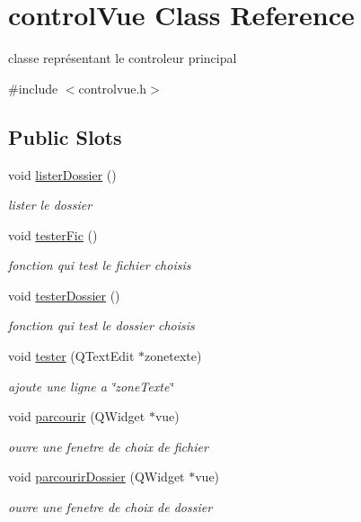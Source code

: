 \hypertarget{classcontrol_vue}{\section{control\-Vue Class Reference}
\label{classcontrol_vue}
}


classe représentant le controleur principal  




{\ttfamily \#include $<$controlvue.\-h$>$}

\subsection*{Public Slots}
\begin{DoxyCompactItemize}
\item 
void \hyperlink{classcontrol_vue_ab18a0b6d63a57aaa15b2c8e016c3579f}{lister\-Dossier} ()
\begin{DoxyCompactList}\small\item\em lister le dossier \end{DoxyCompactList}\item 
void \hyperlink{classcontrol_vue_a8139fd2a944a2fca901809edd2468a1e}{tester\-Fic} ()
\begin{DoxyCompactList}\small\item\em fonction qui test le fichier choisis \end{DoxyCompactList}\item 
void \hyperlink{classcontrol_vue_a630d60f73a0cdb77d2f7f92050983da7}{tester\-Dossier} ()
\begin{DoxyCompactList}\small\item\em fonction qui test le dossier choisis \end{DoxyCompactList}\item 
void \hyperlink{classcontrol_vue_a92d898224293b741e5c6d3a3576a2193}{tester} (Q\-Text\-Edit $\ast$zonetexte)
\begin{DoxyCompactList}\small\item\em ajoute une ligne a \char`\"{}zone\-Texte\char`\"{} \end{DoxyCompactList}\item 
void \hyperlink{classcontrol_vue_aa045a12b0249e1066416f98fe8363f2f}{parcourir} (Q\-Widget $\ast$vue)
\begin{DoxyCompactList}\small\item\em ouvre une fenetre de choix de fichier \end{DoxyCompactList}\item 
void \hyperlink{classcontrol_vue_a6c483102b793f7f8611a1d92224bbb98}{parcourir\-Dossier} (Q\-Widget $\ast$vue)
\begin{DoxyCompactList}\small\item\em ouvre une fenetre de choix de dossier \end{DoxyCompactList}\end{DoxyCompactItemize}


